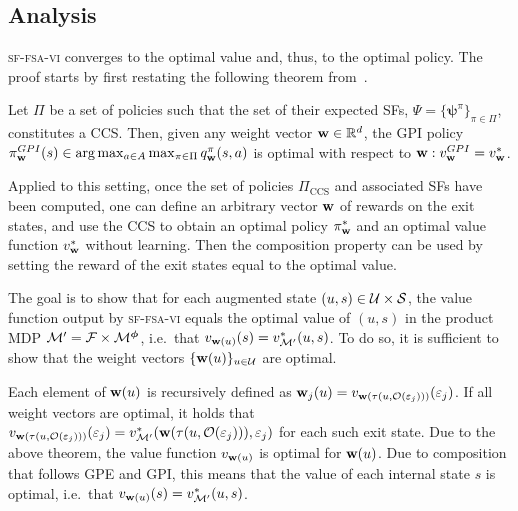 \subsection{Analysis} 
\textsc{sf-fsa-vi} converges to the optimal value and, thus, to the optimal policy. The proof starts by first restating the following theorem from~\citep{Alegre2022}.

\begin{theorem}
Let $\Pi$ be a set of policies such that the set of their expected SFs, $\Psi=\{\boldsymbol{\psi}^\pi\}_{\pi\in\Pi}$, constitutes a CCS. Then, given any weight vector $\mathbf{w}\in\mathbb{R}^d$, the GPI policy $\pi_{\mathbf{w}}^{GPI}(s) \in \arg \max_{a\in A} \max_{\pi\in\Pi} q_{\mathbf{w}}^\pi(s,a)$ is
optimal with respect to ${\mathbf{w}: v_{\mathbf{w}}^{GPI} = v_{\mathbf{w}}^*}$.
\end{theorem}

\noindent
Applied to this setting, once the set of policies $\Pi_\text{CCS}$ and associated SFs have been computed, one can define an arbitrary vector $\mathbf{w}$ of rewards on the exit states, and use the CCS to obtain an optimal policy $\pi_{\mathbf{w}}^*$ and an optimal value function $v_{\mathbf{w}}^*$ without learning. Then the composition property can be used by setting the reward of the exit states equal to the optimal value.

The goal is to show that for each augmented state ${(u,s)\in\mathcal{U}\times\mathcal{S}}$, the value function output by \textsc{sf-fsa-vi} equals the optimal value of $(u,s)$ in the product MDP $\mathcal{M}'=\mathcal{F}\times\mathcal{M}^{\boldsymbol{\phi}}$, i.e.~that $v_{\mathbf{w}(u)}(s)=v_{\mathcal{M}'}^*(u,s)$. To do so, it is sufficient to show that the weight vectors $\{\mathbf{w}(u)\}_{u\in\mathcal{U}}$ are optimal.

Each element of $\mathbf{w}(u)$ is recursively defined as $\mathbf{w}_j(u)=v_{\mathbf{w}(\tau(u,\mathcal{O}(\varepsilon_j)))}(\varepsilon_j)$. If all weight vectors are optimal, it holds that $v_{\mathbf{w}(\tau(u,\mathcal{O}(\varepsilon_j)))}(\varepsilon_j)=v_{\mathcal{M}'}^*(\mathbf{w}(\tau(u,\mathcal{O}(\varepsilon_j))),\varepsilon_j)$ for each such exit state. Due to the above theorem, the value function $v_{\mathbf{w}(u)}$ is optimal for $\mathbf{w}(u)$. Due to composition that follows GPE and GPI, this means that the value of each internal state $s$ is optimal, i.e.~that $v_{\mathbf{w}(u)}(s)=v_{\mathcal{M}'}^*(u,s)$.

